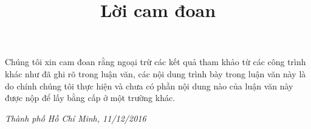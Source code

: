 \title{Lời cam đoan}

Chúng tôi xin cam đoan rằng ngoại trừ các kết quả tham khảo từ các công trình khác
như đã ghi rõ trong luận văn, các nội dung trình bày trong luận văn này là do chính chúng tôi
thực hiện và chưa có phần nội dung nào của luận văn này được nộp để lấy bằng cấp ở một
trường khác.


\large \emph{Thành phố Hồ Chí Minh, 11/12/2016}

\vfill %